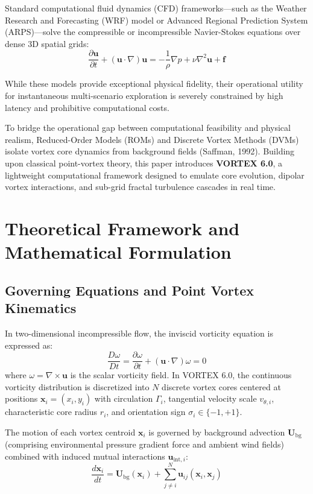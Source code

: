 \documentclass[11pt, a4paper]{article}
\begin{document}
Standard computational fluid dynamics (CFD) frameworks---such as the Weather Research and Forecasting (WRF) model or Advanced Regional Prediction System (ARPS)---solve the compressible or incompressible Navier-Stokes equations over dense 3D spatial grids:
\begin{equation}
\frac{\partial \mathbf{u}}{\partial t} + (\mathbf{u} \cdot \nabla)\mathbf{u} = -\frac{1}{\rho}\nabla p + \nu \nabla^2 \mathbf{u} + \mathbf{f}
\end{equation}

While these models provide exceptional physical fidelity, their operational utility for instantaneous multi-scenario exploration is severely constrained by high latency and prohibitive computational costs.

To bridge the operational gap between computational feasibility and physical realism, Reduced-Order Models (ROMs) and Discrete Vortex Methods (DVMs) isolate vortex core dynamics from background fields (Saffman, 1992). Building upon classical point-vortex theory, this paper introduces \textbf{VORTEX 6.0}, a lightweight computational framework designed to emulate core evolution, dipolar vortex interactions, and sub-grid fractal turbulence cascades in real time.

\section{Theoretical Framework and Mathematical Formulation}

\subsection{Governing Equations and Point Vortex Kinematics}

In two-dimensional incompressible flow, the inviscid vorticity equation is expressed as:
\begin{equation}
\frac{D\omega}{Dt} = \frac{\partial \omega}{\partial t} + (\mathbf{u} \cdot \nabla)\omega = 0
\end{equation}
where $\omega = \nabla \times \mathbf{u}$ is the scalar vorticity field. In VORTEX 6.0, the continuous vorticity distribution is discretized into $N$ discrete vortex cores centered at positions $\mathbf{x}_i = (x_i, y_i)$ with circulation $\Gamma_i$, tangential velocity scale $v_{\theta, i}$, characteristic core radius $r_i$, and orientation sign $\sigma_i \in \{-1, +1\}$.

The motion of each vortex centroid $\mathbf{x}_i$ is governed by background advection $\mathbf{U}_{\text{bg}}$ (comprising environmental pressure gradient force and ambient wind fields) combined with induced mutual interactions $\mathbf{u}_{\text{int}, i}$:
\begin{equation}
\frac{d\mathbf{x}_i}{dt} = \mathbf{U}_{\text{bg}}(\mathbf{x}_i) + \sum_{j \neq i}^{N} \mathbf{u}_{ij}(\mathbf{x}_i, \mathbf{x}_j)
\end{equation}
\end{document}
